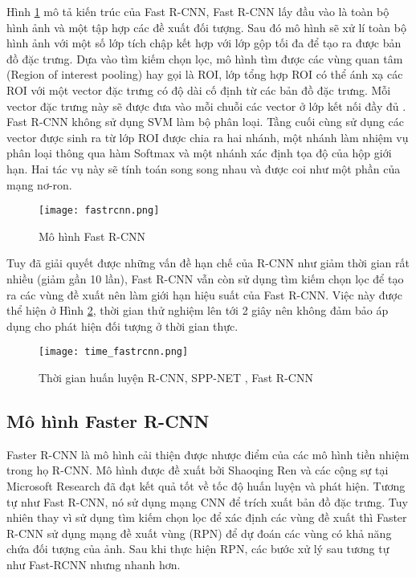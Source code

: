 \documentclass[../the.tex]{subfiles}
\begin{document}
\bigskip

{\fontsize{13}{12} \selectfont

	Hình \ref{fig:fastrcnn} mô tả kiến trúc của Fast R-CNN, Fast R-CNN lấy đầu vào là toàn bộ hình ảnh và một tập hợp các đề xuất đối tượng. Sau đó mô hình sẽ xử lí toàn bộ hình ảnh với một số lớp tích chập kết hợp với lớp gộp tối đa để tạo ra được bản đồ đặc trưng.
	Dựa vào tìm kiếm chọn lọc, mô hình tìm được các vùng quan tâm (Region of interest pooling) hay gọi là ROI, lớp tổng hợp ROI có thể ánh xạ các ROI với một vector đặc trưng có độ dài cố định từ các bản đồ đặc trưng. Mỗi vector đặc trưng này sẽ được đưa vào mỗi chuỗi các vector ở lớp kết nối đầy đủ \cite{girshick2015fast}.
	Fast R-CNN không sử dụng SVM làm bộ phân loại. Tầng cuối cùng sử dụng các vector được sinh ra từ lớp ROI được chia ra hai nhánh, một nhánh làm nhiệm vụ phân loại thông qua hàm Softmax và một nhánh xác định tọa độ của hộp giới hạn. Hai tác vụ này sẽ tính toán song song nhau và được coi như một phần của mạng nơ-ron.

}

\begin{figure}[H]
	\centering
	\texttt{[image: fastrcnn.png]}
	\caption{Mô hình Fast R-CNN \cite{girshick2015fast}}
	\label{fig:fastrcnn}
\end{figure}

\bigskip

{\fontsize{13}{12} \selectfont

	Tuy đã giải quyết được những vấn đề hạn chế của R-CNN như giảm thời gian rất nhiều (giảm gần 10 lần), Fast R-CNN vẫn còn sử dụng tìm kiếm chọn lọc để tạo ra các vùng đề xuất nên làm giới hạn hiệu suất của Fast R-CNN. Việc này được thể hiện ở Hình \ref{fig:timefastrcnn},
	thời gian thử nghiệm lên tới 2 giây nên không đảm bảo áp dụng cho phát hiện đối tượng ở thời gian thực.

}

\begin{figure}[H]
	\centering
	\texttt{[image: time\_fastrcnn.png]}
	\caption{Thời gian huấn luyện R-CNN, SPP-NET \cite{He_2014}, Fast R-CNN \cite{testtimefastrcnn}}
	\label{fig:timefastrcnn}
\end{figure}

\subsection{Mô hình Faster R-CNN}

{\fontsize{13}{12} \selectfont

	Faster R-CNN là mô hình cải thiện được nhược điểm của các mô hình tiền nhiệm trong họ R-CNN. Mô hình được đề xuất bởi
	Shaoqing Ren và các cộng sự tại Microsoft Research \cite{ren2016faster} đã
	đạt kết quả tốt về tốc độ huấn luyện và phát hiện. Tương tự như Fast R-CNN, nó sử dụng mạng CNN để trích xuất bản đồ đặc trưng.
	Tuy nhiên thay vì sử dụng tìm kiếm chọn lọc để xác định các vùng đề xuất thì Faster R-CNN sử dụng mạng đề xuất vùng (RPN) để dự đoán các vùng có khả năng chứa đối tượng của ảnh.
	Sau khi thực hiện RPN, các bước xử lý sau tương tự như Fast-RCNN nhưng nhanh hơn.

}
\end{document}
